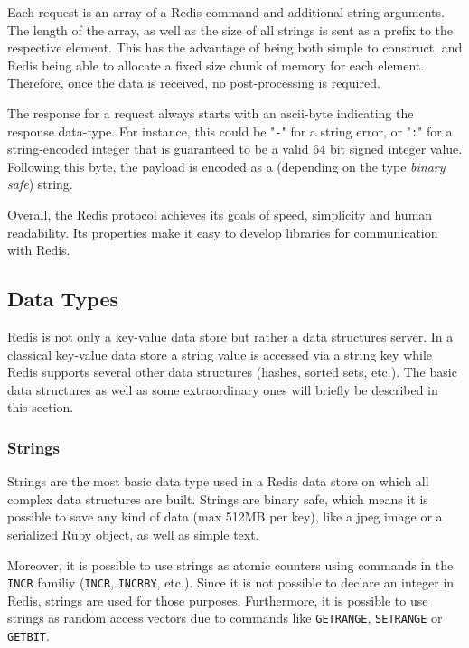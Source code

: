 Each request is an array of a Redis command and additional string arguments. The
length of the array, as well as the size of all strings is sent as a prefix to
the respective element. This has the advantage of being both simple to construct,
and Redis being able to allocate a fixed size chunk of memory for each element.
Therefore, once the data is received, no post-processing is required.
\parencite{redis:protocol}

The response for a request always starts with an \acrshort{ascii}-byte
indicating the response data-type. For instance, this could be "\texttt{-}" for
a string error, or "\texttt{:}" for a string-encoded integer that is guaranteed
to be a valid $64$ bit signed integer value. Following this byte, the payload is
encoded as a (depending on the type \textit{binary safe}) string.
\parencite{redis:protocol}

Overall, the Redis protocol achieves its goals of speed, simplicity and human
readability. Its properties make it easy to develop libraries for communication
with Redis.

\subsection{Data Types} \label{redis:dataTypes}
Redis is not only a key-value data store but rather a data structures server. In a
classical key-value data store a string value is accessed via a string key while
Redis supports several other data structures (hashes, sorted sets, etc.). The
basic data structures as well as some extraordinary ones will briefly be
described in this section. \parencite{redis:dataTypesIntroduction}

\subsubsection*{Strings}
Strings are the most basic data type used in a Redis data store on which all
complex data structures are built. Strings are binary safe, which means it is
possible to save any kind of data (max 512MB per key), like a \gls{jpeg}
image or a serialized Ruby object, as well as simple text.

Moreover, it is possible to use strings as atomic counters using commands in the
\texttt{INCR} familiy (\texttt{INCR}, \texttt{INCRBY}, etc.). Since it is not
possible to declare an integer in Redis, strings are used for those purposes.
Furthermore, it is possible to use strings as random access vectors due to
commands like \texttt{GETRANGE}, \texttt{SETRANGE} or \texttt{GETBIT}.
\parencite{redis:dataTypesIntroduction, redis:commands, redis:dataTypes}

